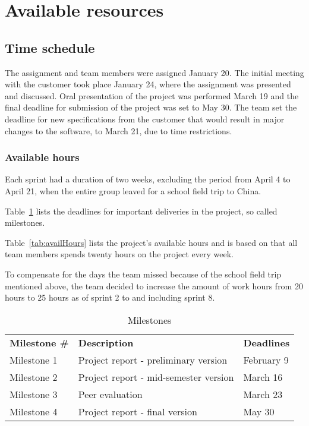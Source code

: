 \section{Available resources}
\subsection{Time schedule}
The assignment and team members were assigned January 20. The initial meeting with the customer took place January 24, where the assignment was presented and discussed. Oral presentation of the project was performed March 19 and the final deadline for submission of the project was set to May 30. The team set the deadline for new specifications from the customer that would result in major changes to the software, to March 21, due to time restrictions.

\subsubsection{Available hours}
Each sprint had a duration of two weeks, excluding the period from April 4 to April 21, when the entire group leaved for a school field trip to China.

Table~\ref{tab:milestones} lists the deadlines for important deliveries in the project, so called milestones.

Table~\ref{tab:availHours} lists the project's available hours and is based on that all team members spends twenty hours on the project every week.

To compensate for the days the team missed because of the school field trip mentioned above, the team decided to increase the amount of work hours from 20 hours to 25 hours as of sprint 2 to and including sprint 8.

\begin{table}[H]
\centering
{}
\begin{tabular}{|l|l|l|}
\hline
\textbf{Milestone \#} & \textbf{Description} & \textbf{Deadlines}\\
Milestone 1& Project report - preliminary version & February 9 \\
Milestone 2 & Project report - mid-semester version & March 16  \\
Milestone 3 & Peer evaluation & March 23  \\
 Milestone 4 & Project report - final version & May 30\\\hline
\end{tabular}
\caption{Milestones}
\label{tab:milestones}
\end{table}

